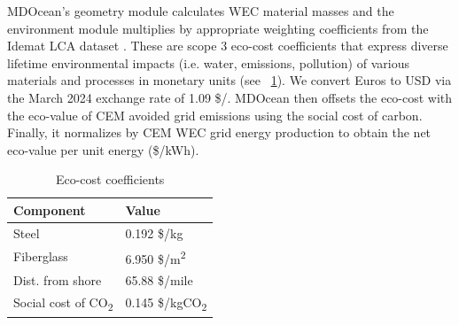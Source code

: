 \documentclass[10pt,twoside]{article}
\begin{document}
MDOcean's geometry module calculates WEC material masses and the environment module multiplies by appropriate weighting coefficients from the Idemat LCA dataset \cite{van_den_herik_idemat_2024}. These are scope 3 eco-cost coefficients \cite{vogtlander_lca-based_2010} that express diverse lifetime environmental impacts (i.e. water, emissions, pollution) of various materials and processes in monetary units (see \tableautorefname~\ref{tab:lca-weights}).
We convert Euros to USD via the March 2024 exchange rate of 1.09 \$/\texteuro.
MDOcean then offsets the eco-cost with the eco-value of CEM avoided grid emissions using the social cost of carbon. Finally, it normalizes by CEM WEC grid energy production to obtain the net eco-value per unit energy (\$/kWh).
\begin{minipage}[m]{0.34\textwidth}
    \begin{table}[H]
    \begin{tabular}{ ll } 
        \hline
        Component & Value \\ 
        \hline
        Steel & 0.192 \$/kg \\ 
        Fiberglass & 6.950 \$/m\textsuperscript{2} \\ 
        Dist. from shore & 65.88 \$/mile \\ 
        Social cost of CO\textsubscript{2} & 0.145 \$/kgCO\textsubscript{2} \\
    \end{tabular}
    \caption{Eco-cost coefficients}
    \label{tab:lca-weights}
    \end{table}
\end{minipage}
\hfill
\end{document}
